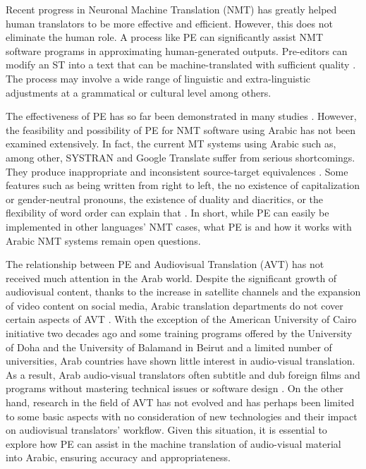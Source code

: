 \documentclass[english]{textolivre}
\begin{document}
Recent progress in Neuronal Machine Translation (NMT) has greatly helped human translators to be more effective and efficient. However, this does not eliminate the human role. A process like PE can significantly assist NMT software programs in approximating human-generated outputs. Pre-editors can modify an ST into a text that can be machine-translated with sufficient quality \cite{miyata_understanding_2021}. The process may involve a wide range of linguistic and extra-linguistic adjustments at a grammatical or cultural level among others.

The effectiveness of PE has so far been demonstrated in many studies \cite{pym1990pre}. However, the feasibility and possibility of PE for NMT software using Arabic has not been examined extensively. In fact, the current MT systems using Arabic such as, among other, SYSTRAN and Google Translate suffer from serious shortcomings. They produce inappropriate and inconsistent source-target equivalences \cite{jaber2015landscape}. Some features such as being written from right to left, the no existence of capitalization or gender-neutral pronouns, the existence of duality and diacritics, or the flexibility of word order can explain that \cite{izwaini2015machine}. In short, while PE can easily be implemented in other languages’ NMT cases, what PE is and how it works with Arabic NMT systems remain open questions.

The relationship between PE and Audiovisual Translation (AVT) has not received much attention in the Arab world. Despite the significant growth of audiovisual content, thanks to the increase in satellite channels and the expansion of video content on social media, Arabic translation departments do not cover certain aspects of AVT \cite[p. 80, p.1]{gamal2007audiovisual, gamal2014}. With the exception of the American University of Cairo initiative two decades ago and some training programs offered by the University of Doha and the University of Balamand in Beirut and a limited number of universities, Arab countries have shown little interest in audio-visual translation. As a result, Arab audio-visual translators often subtitle and dub foreign films and programs without mastering technical issues or software design \cite{jaber2015landscape}. On the other hand, research in the field of AVT has not evolved and has perhaps been limited to some basic aspects with no consideration of new technologies and their impact on audiovisual translators’ workflow. Given this situation, it is essential to explore how PE can assist in the machine translation of audio-visual material into Arabic, ensuring accuracy and appropriateness.
\end{document}
